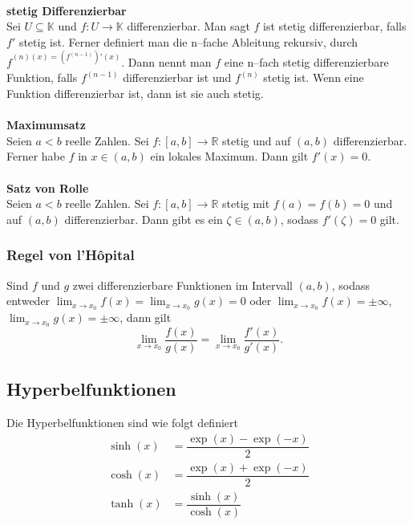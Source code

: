 \documentclass[a4paper,12pt]{article}
\numberwithin{equation}{section}
\begin{document}
\hfill\\\textbf{stetig Differenzierbar}\\ 
Sei $U\subseteq \mathbb{K}$ und $f:U\rightarrow \mathbb{K}$ differenzierbar. Man sagt $f$ ist stetig differenzierbar, falls $f'$ stetig ist. Ferner definiert man die n--fache Ableitung rekursiv, durch $f^{\left(n\right)\left(x\right)=\left(f^{\left(n-1\right)}\right)'\left(x\right)}$. Dann nennt man $f$ eine n--fach stetig differenzierbare Funktion, falls $f^{\left(n-1\right)}$ differenzierbar ist und $f^{\left(n\right)}$ stetig ist. Wenn eine Funktion differenzierbar ist, dann ist sie auch stetig.
\\\hfill\\\textbf{Maximumsatz}\\ 
Seien $a<b$ reelle Zahlen. Sei $f:[a,b]\rightarrow \mathbb{R}$ stetig und auf $\left(a,b\right)$ differenzierbar. Ferner habe $f$ in $x \in \left(a,b\right)$ ein lokales Maximum. Dann gilt $f'\left(x\right)=0$.
\\\hfill\\\textbf{Satz von Rolle}\\ 
Seien $a<b$ reelle Zahlen. Sei $f:[a,b]\rightarrow \mathbb{R}$ stetig mit $f\left(a\right)=f\left(b\right)=0$ und auf $\left(a,b\right)$ differenzierbar. Dann gibt es ein $\zeta  \in \left(a,b\right)$, sodass $f'\left(\zeta \right)=0$ gilt.

\subsubsection{Regel von l'H\^{o}pital}
Sind $f$ und $g$ zwei differenzierbare Funktionen im Intervall $\left(a,b\right)$, sodass entweder $\lim_{x\rightarrow x_0}f\left(x\right)=\lim_{x\rightarrow x_0}g\left(x\right)=0$ oder $\lim_{x\rightarrow x_0}f\left(x\right)=\pm \infty$, $\lim_{x\rightarrow x_0}g\left(x\right)=\pm \infty$, dann gilt
\[ 
        \lim_{x\rightarrow x_0}\dfrac{f\left(x\right)}{g\left(x\right)}=\lim_{x\rightarrow x_0}\dfrac{f'\left(x\right)}{g'\left(x\right)}
.\] 

\subsection{Hyperbelfunktionen}
Die Hyperbelfunktionen sind wie folgt definiert
\begin{align*} %
        \sinh\left(x\right)&=\dfrac{\exp\left(x\right)-\exp\left(-x\right)}{2}\\
        \cosh\left(x\right)&=\dfrac{\exp\left(x\right)+\exp\left(-x\right)}{2}\\
        \tanh\left(x\right)&=\dfrac{\sinh\left(x\right)}{\cosh\left(x\right)}
\end{align*}
\end{document}
